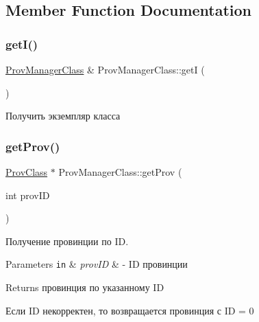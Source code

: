 \subsection{Member Function Documentation}
\mbox{\label{class_prov_manager_class_a9692476132879204adcacf5bc44eca8d}} 
\subsubsection{\texorpdfstring{get\+I()}{getI()}}
{\footnotesize\ttfamily \hyperlink{class_prov_manager_class}{Prov\+Manager\+Class} \& Prov\+Manager\+Class\+::getI (\begin{DoxyParamCaption}{ }\end{DoxyParamCaption})\hspace{0.3cm}{\ttfamily [static]}}



Получить экземпляр класса 

\mbox{\label{class_prov_manager_class_a182acf33b469309e4f2695eaf3d9a8fe}} 
\subsubsection{\texorpdfstring{get\+Prov()}{getProv()}}
{\footnotesize\ttfamily \hyperlink{class_prov_class}{Prov\+Class} $\ast$ Prov\+Manager\+Class\+::get\+Prov (\begin{DoxyParamCaption}\item[{int}]{prov\+ID }\end{DoxyParamCaption})}



Получение провинции по ID. 


\begin{DoxyParams}[1]{Parameters}
\mbox{\tt in}  & {\em prov\+ID} & -\/ ID провинции \\
\hline
\end{DoxyParams}
\begin{DoxyReturn}{Returns}
провинция по указанному ID
\end{DoxyReturn}
Если ID некорректен, то возвращается провинция с ID = 0 \mbox{\label{class_prov_manager_class_ad67b95a1e965203058f235af9ce593dc}} 
